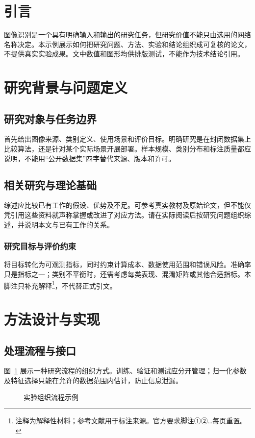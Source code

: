 \section*{引言}
图像识别是一个具有明确输入和输出的研究任务，但研究价值不能只由选用的网络名称决定。本示例展示如何把研究问题、方法、实验和结论组织成可复核的论文，不提供真实实验成果。文中数值和图形均供排版测试，不能作为技术结论引用。
\section{研究背景与问题定义}
\subsection{研究对象与任务边界}
首先给出图像来源、类别定义、使用场景和评价目标。明确研究是在封闭数据集上比较算法，还是针对某个实际场景开展部署。样本规模、类别分布和标注质量都应说明，不能用“公开数据集”四字替代来源、版本和许可。
\subsection{相关研究与理论基础}
综述应比较已有工作的假设、优势及不足。可参考真实教材及原始论文\cite{zhou2016,vaswani2017,lecun2015}，但不能仅凭引用这些资料就声称掌握或改进了对应方法。请在实际阅读后按研究问题组织综述，并说明本文与已有工作的关系。
\subsubsection{研究目标与评价约束}
将目标转化为可观测指标，同时约束计算成本、数据使用范围和错误风险。准确率只是指标之一；类别不平衡时，还需考虑每类表现、混淆矩阵或其他合适指标。本脚注只补充解释\footnote{注释为解释性材料；参考文献用于标注来源。官方要求脚注①②…每页重置。}，不代替正式引文。
\section{方法设计与实现}
\subsection{处理流程与接口}
图~\ref{fig:pipeline} 展示一种研究流程的组织方式。训练、验证和测试应分开管理；归一化参数及特征选择只能在允许的数据范围内估计，防止信息泄漏。
\begin{figure}[htbp]\centering
{}
\caption{实验组织流程示例}\label{fig:pipeline}
\end{figure}
